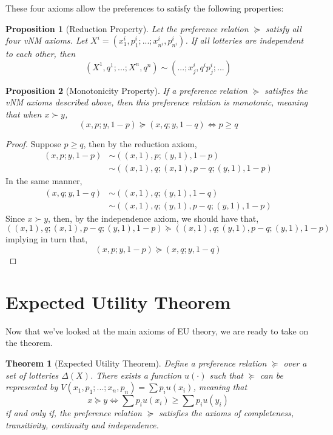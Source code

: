 \documentclass[12pt]{report}
\newtheorem{theorem}{Theorem}[chapter]
\newtheorem{proposition}{Proposition}[chapter]
\begin{document}
These four axioms allow the preferences to satisfy the following properties:

\begin{proposition}[Reduction Property] 
Let the preference relation $\succeq$ satisfy all four vNM axioms. Let $X^i = (x_1^i,p_1^i; ...; x_{n^i}^i,p_{n^i}^i)$. If all lotteries are independent to each other, then $$(X^1,q^1; ...; X^n, q^n) \sim (...; x_j^i,q^ip_j^i; ...)$$
\end{proposition}

\begin{proposition}[Monotonicity Property]
If a preference relation $\succeq$ satisfies the vNM axioms described above, then this preference relation is monotonic, meaning that when $x\succ y$, $$(x,p;y,1-p)\succeq (x,q;y,1-q) \Leftrightarrow p\geq q$$
\end{proposition}

\begin{proof}
Suppose $p\geq q$, then by the reduction axiom, \begin{align*}
(x,p;y,1-p) &\sim ((x,1),p;(y,1),1-p)\\
&\sim ((x,1),q; (x,1),p-q; (y,1),1-p)
\end{align*} In the same manner, \begin{align*}
(x,q;y,1-q) &\sim ((x,1),q;(y,1),1-q)\\
&\sim ((x,1),q; (y,1),p-q; (y,1),1-p)
\end{align*} Since $x\succ y$, then, by the independence axiom, we should have that, $$((x,1),q; (x,1),p-q; (y,1),1-p)\succeq((x,1),q; (y,1),p-q; (y,1),1-p) $$ implying in turn that, $$(x,p;y,1-p)\succeq (x,q;y,1-q) $$
\end{proof}

\section{Expected Utility Theorem}

Now that we've looked at the main axioms of EU theory, we are ready to take on the theorem.

\begin{theorem}[Expected Utility Theorem]
Define a preference relation $\succeq$ over a set of lotteries $\Delta (X)$. There exists a function $u(\cdot)$ such that $\succeq$ can be represented by $V(x_1,p_1; ...; x_n,p_n) = \sum p_iu(x_i)$, meaning that $$x\succeq y \Leftrightarrow \sum p_iu(x_i) \geq \sum p_iu(y_i)$$ if and only if, the preference relation $\succeq$ satisfies the axioms of completeness, transitivity, continuity and independence.
\end{theorem}
\end{document}
